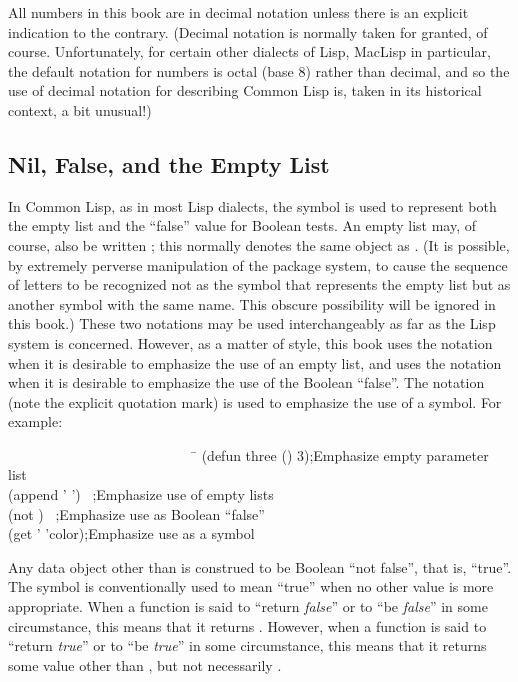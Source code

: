 All numbers in this book are in decimal notation unless
there is an explicit indication to the contrary.
(Decimal notation is normally taken for granted, of course.
Unfortunately, for certain other dialects of Lisp, MacLisp in particular,
the default notation for numbers is octal (base 8) rather than decimal,
and so the use of decimal notation for describing Common Lisp is,
taken in its historical context, a bit unusual!)

\subsection{Nil, False, and the Empty List}

In Common Lisp, as in most Lisp dialects, the symbol 
 is used to represent both the empty list and the ``false'' value
for Boolean tests.  An empty list may, of course, also be written
\cd{()}; this normally denotes the same object as .
(It is possible, by extremely perverse manipulation of the package system,
to cause the sequence of letters  to be recognized
not as the symbol that represents the empty list but as another
symbol with the same name.  This obscure possibility will be ignored
in this book.)
These two notations may be used interchangeably as far as the Lisp
system is concerned.  However, as a matter of style,
this book
uses the notation {\emptylist} when it is desirable to emphasize
the use of an empty list, and uses the notation {\false}
when it is desirable to emphasize the use of the Boolean ``false''.
The notation  (note the explicit quotation mark) is used to emphasize
the use of a symbol.
For example:
\begin{lisp}
~~~~~~~~~~~~~~~~~~~~~~~~~~~\=\kill
(defun three () 3)\>;{\rm Emphasize empty parameter list} \\
(append '{\emptylist} '{\emptylist}) \EV\ {\emptylist}\>;{\rm Emphasize use of empty lists} \\
(not {\false}) \EV\ {\true}\>;{\rm Emphasize use as Boolean ``false''} \\
(get '{\nil} 'color)\>;{\rm Emphasize use as a symbol}
\end{lisp}

Any data object other than {\false} is construed to be Boolean
``not false'', that is, ``true''.  The symbol {\true} is conventionally
used to mean ``true'' when no other value is more appropriate.
When a function is said to ``return \emph{false}'' or to ``be \emph{false}''
in some circumstance, this means that it returns {\false}.
However, when a function is said to ``return \emph{true}'' or to ``be \emph{true}''
in some circumstance, this means that it returns some value other
than {\false}, but not necessarily {\true}.


